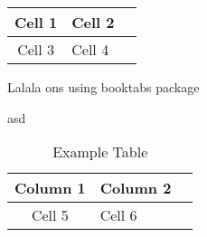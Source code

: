 \documentclass{article}
\begin{document}
    \begin{tabular}{|c | l | r|}
        \hline Cell 1 & Cell 2 \\
        \hline Cell 3 & Cell 4 \\
        \hline
    \end{tabular}
Lalala
ons using booktabs package

    \begin{table}
    asd
        \caption{Example Table}
        \label{tab:example-table}
        \begin{tabular}{|c | l | r|}
            \hline
            Column 1 & Column 2 \\
            \hline Cell 5 & Cell 6 \\
            \hline
        \end{tabular}
    \end{table}


\end{document}
